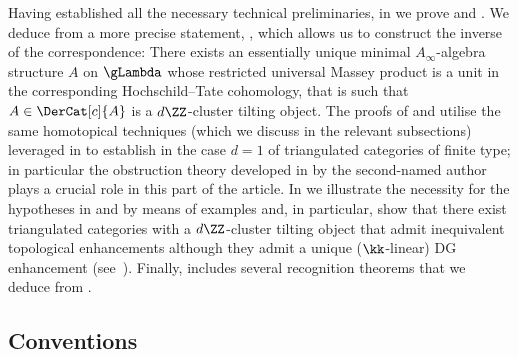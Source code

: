 \documentclass[a4paper]{amsart}
\begin{document}
Having established all the necessary technical preliminaries, in
 we prove
 and . We
deduce  from a more precise statement,
, which allows us to construct the inverse of the
correspondence: There exists an essentially unique minimal $A_\infty$-algebra
structure $A$ on $\gLambda$ whose restricted universal Massey product is a unit
in the corresponding Hochschild--Tate cohomology, that is such that
$A\in\DerCat[c]{A}$ is a $d\ZZ$-cluster tilting object. The proofs of
 and  utilise the same
homotopical techniques (which we discuss in the relevant subsections) leveraged
in \cite{Mur22} to establish  in the case
$d=1$ of triangulated categories of finite type; in particular the obstruction
theory developed in \cite{Mur20b} by the second-named author plays a crucial
role in this part of the article. In  we
illustrate the necessity for the hypotheses in
 and
 by means of examples and, in
particular, show that there exist triangulated categories with a $d\ZZ$-cluster
tilting object that admit inequivalent topological enhancements although they
admit a unique ($\kk$-linear) DG enhancement
(see~). Finally,
 includes several recognition theorems that we deduce
from .

\subsection*{Conventions}
\end{document}
